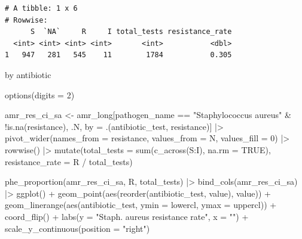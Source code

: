 \documentclass[
  letterpaper,
  DIV=11,
  numbers=noendperiod]{scrreprt}
\newenvironment{Shaded}{\begin{snugshade}}{\end{snugshade}}
\newcommand{\AttributeTok}[1]{\textcolor[rgb]{0.40,0.45,0.13}{#1}}
\newcommand{\ConstantTok}[1]{\textcolor[rgb]{0.56,0.35,0.01}{#1}}
\newcommand{\DecValTok}[1]{\textcolor[rgb]{0.68,0.00,0.00}{#1}}
\newcommand{\FunctionTok}[1]{\textcolor[rgb]{0.28,0.35,0.67}{#1}}
\newcommand{\NormalTok}[1]{\textcolor[rgb]{0.00,0.23,0.31}{#1}}
\newcommand{\OtherTok}[1]{\textcolor[rgb]{0.00,0.23,0.31}{#1}}
\newcommand{\SpecialCharTok}[1]{\textcolor[rgb]{0.37,0.37,0.37}{#1}}
\newcommand{\StringTok}[1]{\textcolor[rgb]{0.13,0.47,0.30}{#1}}
\begin{document}
\begin{verbatim}
# A tibble: 1 x 6
# Rowwise: 
      S  `NA`     R     I total_tests resistance_rate
  <int> <int> <int> <int>       <int>           <dbl>
1   947   281   545    11        1784           0.305
\end{verbatim}

by antibiotic

\begin{Shaded}
\begin{Highlighting}[]
\FunctionTok{options}\NormalTok{(}\AttributeTok{digits =} \DecValTok{2}\NormalTok{)}

\NormalTok{amr\_res\_ci\_sa }\OtherTok{\textless{}{-}}\NormalTok{ amr\_long[pathogen\_name }\SpecialCharTok{==} \StringTok{"Staphylococcus aureus"} \SpecialCharTok{\&} \SpecialCharTok{!}\FunctionTok{is.na}\NormalTok{(resistance), .N, by }\OtherTok{=}\NormalTok{ .(antibiotic\_test, resistance)] }\SpecialCharTok{|\textgreater{}}
    \FunctionTok{pivot\_wider}\NormalTok{(}\AttributeTok{names\_from =}\NormalTok{ resistance, }\AttributeTok{values\_from =}\NormalTok{ N, }\AttributeTok{values\_fill =} \DecValTok{0}\NormalTok{) }\SpecialCharTok{|\textgreater{}}
    \FunctionTok{rowwise}\NormalTok{() }\SpecialCharTok{|\textgreater{}}
    \FunctionTok{mutate}\NormalTok{(}\AttributeTok{total\_tests =} \FunctionTok{sum}\NormalTok{(}\FunctionTok{c\_across}\NormalTok{(S}\SpecialCharTok{:}\NormalTok{I), }\AttributeTok{na.rm =} \ConstantTok{TRUE}\NormalTok{), }
           \AttributeTok{resistance\_rate =}\NormalTok{ R }\SpecialCharTok{/}\NormalTok{ total\_tests)}

\FunctionTok{phe\_proportion}\NormalTok{(amr\_res\_ci\_sa, R, total\_tests) }\SpecialCharTok{|\textgreater{}}
    \FunctionTok{bind\_cols}\NormalTok{(amr\_res\_ci\_sa) }\SpecialCharTok{|\textgreater{}}
    \FunctionTok{ggplot}\NormalTok{() }\SpecialCharTok{+}
    \FunctionTok{geom\_point}\NormalTok{(}\FunctionTok{aes}\NormalTok{(}\FunctionTok{reorder}\NormalTok{(antibiotic\_test, value), value)) }\SpecialCharTok{+}
    \FunctionTok{geom\_linerange}\NormalTok{(}\FunctionTok{aes}\NormalTok{(antibiotic\_test, }\AttributeTok{ymin =}\NormalTok{ lowercl, }\AttributeTok{ymax =}\NormalTok{ uppercl)) }\SpecialCharTok{+}
    \FunctionTok{coord\_flip}\NormalTok{() }\SpecialCharTok{+}
    \FunctionTok{labs}\NormalTok{(}\AttributeTok{y =} \StringTok{"Staph. aureus resistance rate"}\NormalTok{, }\AttributeTok{x =} \StringTok{""}\NormalTok{) }\SpecialCharTok{+} 
    \FunctionTok{scale\_y\_continuous}\NormalTok{(}\AttributeTok{position =} \StringTok{"right"}\NormalTok{)}
\end{Highlighting}
\end{Shaded}
\end{document}
